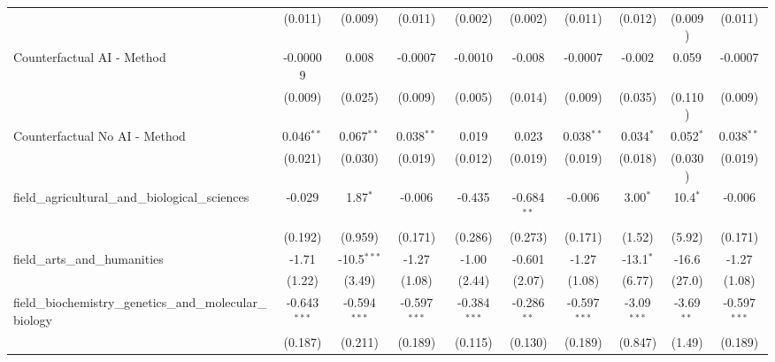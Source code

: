 \begin{tabular}{lccccccccc}
                                                               & (0.011)        & (0.009)        & (0.011)        & (0.002)        & (0.002)       & (0.011)        & (0.012)        & (0.009)       & (0.011)\\   
   Counterfactual AI - Method                                  & -0.00009       & 0.008          & -0.0007        & -0.0010        & -0.008        & -0.0007        & -0.002         & 0.059         & -0.0007\\   
                                                               & (0.009)        & (0.025)        & (0.009)        & (0.005)        & (0.014)       & (0.009)        & (0.035)        & (0.110)       & (0.009)\\   
   Counterfactual No AI - Method                               & 0.046$^{**}$   & 0.067$^{**}$   & 0.038$^{**}$   & 0.019          & 0.023         & 0.038$^{**}$   & 0.034$^{*}$    & 0.052$^{*}$   & 0.038$^{**}$\\   
                                                               & (0.021)        & (0.030)        & (0.019)        & (0.012)        & (0.019)       & (0.019)        & (0.018)        & (0.030)       & (0.019)\\   
   field\_agricultural\_and\_biological\_sciences              & -0.029         & 1.87$^{*}$     & -0.006         & -0.435         & -0.684$^{**}$ & -0.006         & 3.00$^{*}$     & 10.4$^{*}$    & -0.006\\   
                                                               & (0.192)        & (0.959)        & (0.171)        & (0.286)        & (0.273)       & (0.171)        & (1.52)         & (5.92)        & (0.171)\\   
   field\_arts\_and\_humanities                                & -1.71          & -10.5$^{***}$  & -1.27          & -1.00          & -0.601        & -1.27          & -13.1$^{*}$    & -16.6         & -1.27\\   
                                                               & (1.22)         & (3.49)         & (1.08)         & (2.44)         & (2.07)        & (1.08)         & (6.77)         & (27.0)        & (1.08)\\   
   field\_biochemistry\_genetics\_and\_molecular\_biology      & -0.643$^{***}$ & -0.594$^{***}$ & -0.597$^{***}$ & -0.384$^{***}$ & -0.286$^{**}$ & -0.597$^{***}$ & -3.09$^{***}$  & -3.69$^{**}$  & -0.597$^{***}$\\   
                                                               & (0.187)        & (0.211)        & (0.189)        & (0.115)        & (0.130)       & (0.189)        & (0.847)        & (1.49)        & (0.189)\\   

\end{tabular}
